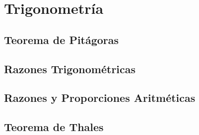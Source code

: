 \section{Trigonometría}

\subsection{Teorema de Pitágoras}

\subsection{Razones Trigonométricas}

 \subsection{Razones y Proporciones Aritméticas}

 \subsection{Teorema de Thales}

 
 
 

